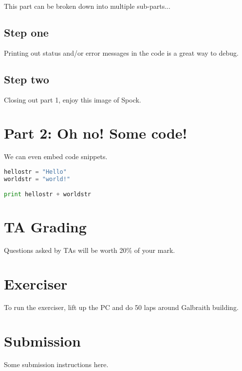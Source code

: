 \documentclass[11pt]{article}
\begin{document}

This part can be broken down into multiple sub-parts...

\subsection{Step one}
\label{subsec:part1-step1}
Printing out status and/or error messages in the code is a great way to debug.

\subsection{Step two}
\label{subsec:part1-step2}
Closing out part 1, enjoy this image of Spock.


\section{Part 2: Oh no! Some code!}
\label{sec:part2}
We can even embed code snippets.
\begin{lstlisting}[caption={Some snippet of code}, language=Python]
hellostr = "Hello"
worldstr = "world!"

print hellostr + worldstr
\end{lstlisting}


\section{TA Grading}
\label{sec:tagrading}
Questions asked by TAs will be worth 20\% of your mark.

\section{Exerciser}
\label{sec:exercise}
To run the exerciser, lift up the PC and do 50 laps around Galbraith building.

\section{Submission}
\label{sec:submission}
Some submission instructions here.
\end{document}
